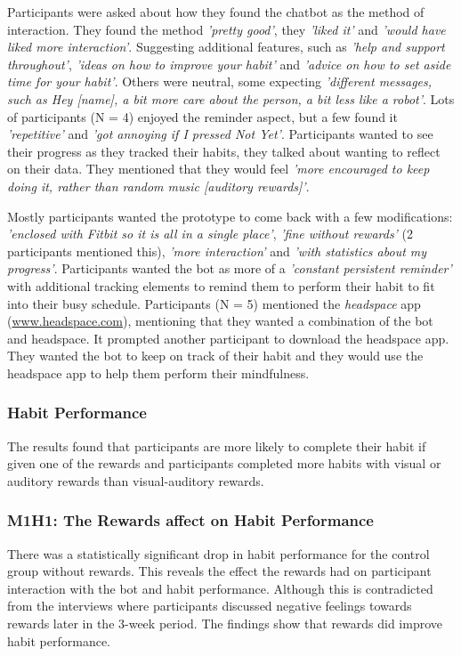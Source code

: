Participants were asked about how they found the chatbot as the method of interaction. They found the method \textit{'pretty good'}, they \textit{'liked it'} and \textit{'would have liked more interaction'}. Suggesting additional features, such as \textit{'help and support throughout'}, \textit{'ideas on how to improve your habit'} and \textit{'advice on how to set aside time for your habit'}. Others were neutral, some expecting \textit{'different messages, such as Hey [name], a bit more care about the person, a bit less like a robot'}. Lots of participants (N = 4) enjoyed the reminder aspect, but a few found it \textit{'repetitive'} and \textit{'got annoying if I pressed Not Yet'}. Participants wanted to see their progress as they tracked their habits, they talked about wanting to reflect on their data. They mentioned that they would feel \textit{'more encouraged to keep doing it, rather than random music [auditory rewards]'}.


Mostly participants wanted the prototype to come back with a few modifications: \textit{'enclosed with Fitbit so it is all in a single place'}, \textit{'fine without rewards'} (2 participants mentioned this), \textit{'more interaction'} and \textit{'with statistics about my progress'}. Participants wanted the bot as more of a \textit{'constant persistent reminder'} with additional tracking elements to remind them to perform their habit to fit into their busy schedule. Participants (N = 5) mentioned the \textit{headspace} app (\url{www.headspace.com}), mentioning that they wanted a combination of the bot and headspace. It prompted another participant to download the headspace app. They wanted the bot to keep on track of their habit and they would use the headspace app to help them perform their mindfulness.


\subsubsection{Habit Performance}
The results found that participants are more likely to complete their habit if given one of the rewards and participants completed more habits with visual or auditory rewards than visual-auditory rewards.

\subsubsection*{M1H1: The Rewards affect on Habit Performance}
There was a statistically significant drop in habit performance for the control group without rewards. This reveals the effect the rewards had on participant interaction with the bot and habit performance. Although this is contradicted from the interviews where participants discussed negative feelings towards rewards later in the 3-week period. The findings show that rewards did improve habit performance.

